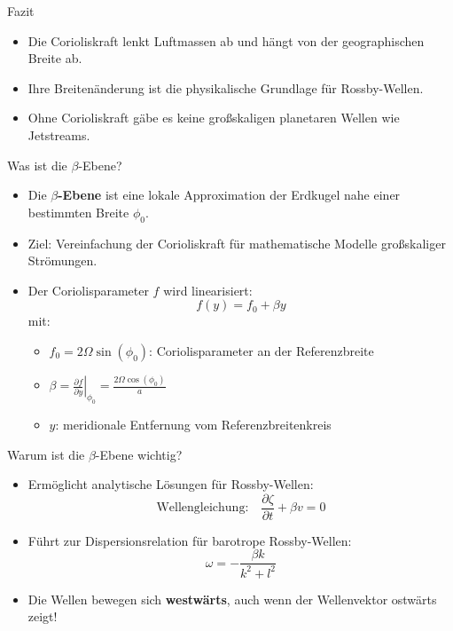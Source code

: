     \begin{frame}{Fazit}
    \begin{itemize}
        \item Die Corioliskraft lenkt Luftmassen ab und hängt von der geographischen Breite ab.
        \item Ihre Breitenänderung ist die physikalische Grundlage für Rossby-Wellen.
        \item Ohne Corioliskraft gäbe es keine großskaligen planetaren Wellen wie Jetstreams.
    \end{itemize}
    \end{frame}
    
    \begin{frame}{Was ist die \(\beta\)-Ebene?}
        \begin{itemize}
            \item Die \textbf{\(\beta\)-Ebene} ist eine lokale Approximation der Erdkugel nahe einer bestimmten Breite \(\phi_0\).
            \item Ziel: Vereinfachung der Corioliskraft für mathematische Modelle großskaliger Strömungen.
            \item Der Coriolisparameter \(f\) wird linearisiert:
            \[
            f(y) = f_0 + \beta y
            \]
            mit:
            \begin{itemize}
                \item \(f_0 = 2\Omega \sin(\phi_0)\): Coriolisparameter an der Referenzbreite
                \item \(\beta = \left.\frac{\partial f}{\partial y}\right|_{\phi_0} = \frac{2\Omega \cos(\phi_0)}{a}\)
                \item \(y\): meridionale Entfernung vom Referenzbreitenkreis
            \end{itemize}
        \end{itemize}
        \end{frame}
        
        \begin{frame}{Warum ist die \(\beta\)-Ebene wichtig?}
        \begin{itemize}
            \item Ermöglicht analytische Lösungen für Rossby-Wellen:
            \[
            \text{Wellengleichung:} \quad \frac{\partial \zeta}{\partial t} + \beta v = 0
            \]
            \item Führt zur Dispersionsrelation für barotrope Rossby-Wellen:
            \[
            \omega = -\frac{\beta k}{k^2 + l^2}
            \]
            \item Die Wellen bewegen sich \textbf{westwärts}, auch wenn der Wellenvektor ostwärts zeigt!
        \end{itemize}
        \end{frame}
        
